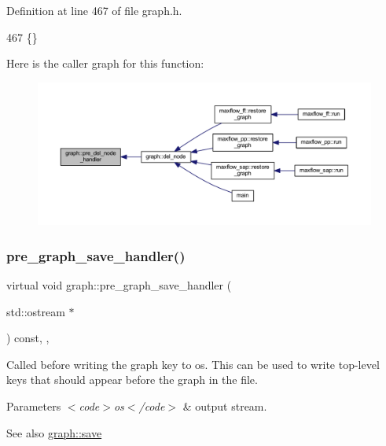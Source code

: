 Definition at line 467 of file graph.\+h.


\begin{DoxyCode}
467 \{\}      
\end{DoxyCode}
Here is the caller graph for this function\+:
\nopagebreak
\begin{figure}[H]
\begin{center}
\leavevmode
\includegraphics[width=350pt]{classgraph_a64699c6cb14cdedab5e13232a8f3e754_icgraph}
\end{center}
\end{figure}
\mbox{\label{classgraph_ab257e02f6fd04fef244032a3a15bec9f}} 
\subsubsection{\texorpdfstring{pre\+\_\+graph\+\_\+save\+\_\+handler()}{pre\_graph\_save\_handler()}}
{\footnotesize\ttfamily virtual void graph\+::pre\+\_\+graph\+\_\+save\+\_\+handler (\begin{DoxyParamCaption}\item[{std\+::ostream $\ast$}]{ }\end{DoxyParamCaption}) const\hspace{0.3cm}{\ttfamily [inline]}, {\ttfamily [virtual]}, {\ttfamily [inherited]}}

Called before writing the graph key to {\ttfamily os}. This can be used to write top-\/level keys that should appear before the graph in the file.


\begin{DoxyParams}{Parameters}
{\em $<$code$>$os$<$/code$>$} & output stream. \\
\hline
\end{DoxyParams}
\begin{DoxySeeAlso}{See also}
\mbox{\hyperlink{classgraph_a7bd0712a528249d1585085a64ac3e661}{graph\+::save}} 
\end{DoxySeeAlso}


